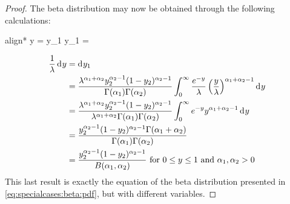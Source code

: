 \documentclass[12pt]{article}
\begin{document}
\begin{proof}
	\noindent The beta distribution may now be obtained through the following calculations:
	\begin{empheq}[box=\widefbox]{align*}
		y = \lambda y_1 \Rightarrow y_1 = 
	\end{empheq}
	\begin{equation}
		\begin{split}
			\frac{1}{\lambda}\mathop{}\!\mathrm{d^{}}y	&=	\mathop{}\!\mathrm{d^{}}y_1\\
										&=	\frac{\lambda^{\alpha_1+\alpha_2}y_2^{\alpha_2-1}(1-y_2)^{\alpha_2-1}}{\Gamma(\alpha_1)\Gamma(\alpha_2)} \int^\infty_0 \frac{e^{-y}}{\lambda}\left(\frac{y}{\lambda}\right)^{\alpha_1+\alpha_2-1}\mathop{}\!\mathrm{d^{}}y\\
										&=	\frac{\lambda^{\alpha_1+\alpha_2}y_2^{\alpha_2-1}(1-y_2)^{\alpha_2-1}}{\lambda^{\alpha_1+\alpha_2}\Gamma(\alpha_1)\Gamma(\alpha_2)} \int^\infty_0 e^{-y}y^{\alpha_1+\alpha_2-1}\mathop{}\!\mathrm{d^{}}y\\
										&=	\frac{y_2^{\alpha_2-1}(1-y_2)^{\alpha_2-1}\Gamma(\alpha_1+\alpha_2)}{\Gamma(\alpha_1)\Gamma(\alpha_2)}\\
										&=	\frac{y_2^{\alpha_2-1}(1-y_2)^{\alpha_2-1}}{B(\alpha_1, \alpha_2)}\text{ for }0\leq y\leq 1\text{ and }\alpha_1, \alpha_2 > 0
		\end{split}
	\end{equation}
	This last result is exactly the equation of the beta distribution presented in \autoref{eq:specialcases:beta:pdf}, but with
	different variables.
\end{proof}

\pagebreak
\end{document}
